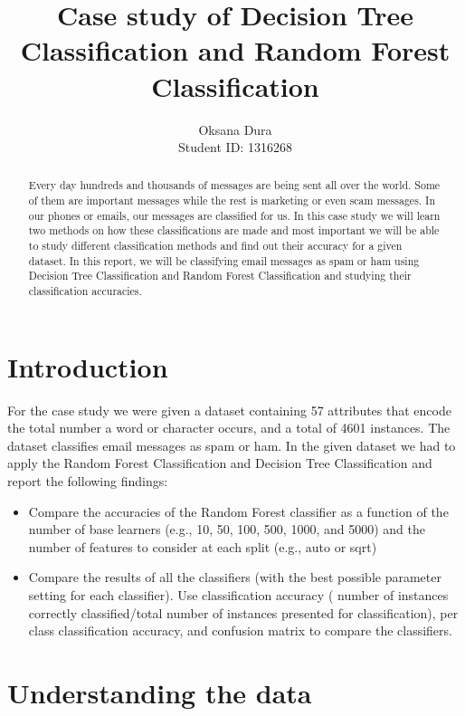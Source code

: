 \documentclass{article}
\title{Case study of Decision Tree Classification and Random Forest Classification}
\author{Oksana Dura 
\\Student ID: 1316268}
\begin{document}
\maketitle

\begin{abstract}
Every day hundreds and thousands of messages are being sent all over the world. Some of them are important messages while the rest is marketing or even scam messages. In our phones or emails, our messages are classified for us. In this case study we will learn two methods on how these classifications are made and most important we will be able to study different classification methods and find out their accuracy for a given dataset. In this report, we will be classifying email messages as spam or ham using Decision Tree Classification and Random Forest Classification and studying their classification accuracies. 
    
\end{abstract}

\section{Introduction}

For the case study we were given a dataset containing 57 attributes that encode the total number a word or character occurs, and a total of 4601 instances. The dataset classifies email messages as spam or ham. In the given dataset we had to apply the Random Forest Classification and Decision Tree Classification and report the following findings: 

\begin{itemize}
  \item Compare the accuracies of the Random Forest classifier as a function of the number of base learners (e.g., 10, 50, 100, 500, 1000, and 5000) and the number of features to consider at each split (e.g., auto or sqrt)
  \item Compare the results of all the classifiers (with the best possible parameter setting for each classifier). Use classification accuracy ( number of instances correctly classified/total number of instances presented for classification), per class classification accuracy, and confusion matrix to compare the classifiers.
\end{itemize}


\section{Understanding the data}
\end{document}

